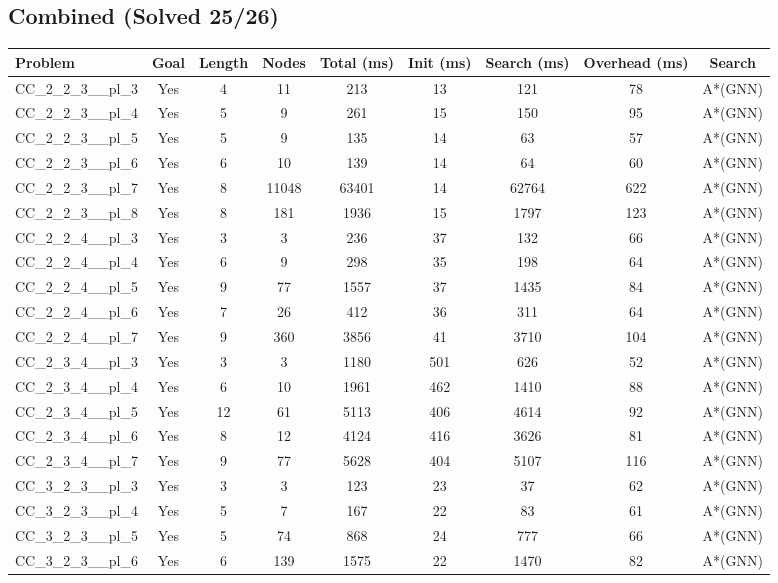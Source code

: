 \documentclass{article}
\begin{document}
\subsection*{Combined (Solved 25/26)}
\begin{tabular}{lcccccccc}
\toprule
Problem & Goal & Length & Nodes & Total (ms) & Init (ms) & Search (ms) & Overhead (ms) & Search \\
\midrule
CC\_2\_2\_3\_\_pl\_3 & Yes & 4 & 11 & 213 & 13 & 121 & 78 & A*(GNN) \\
CC\_2\_2\_3\_\_pl\_4 & Yes & 5 & 9 & 261 & 15 & 150 & 95 & A*(GNN) \\
CC\_2\_2\_3\_\_pl\_5 & Yes & 5 & 9 & 135 & 14 & 63 & 57 & A*(GNN) \\
CC\_2\_2\_3\_\_pl\_6 & Yes & 6 & 10 & 139 & 14 & 64 & 60 & A*(GNN) \\
CC\_2\_2\_3\_\_pl\_7 & Yes & 8 & 11048 & 63401 & 14 & 62764 & 622 & A*(GNN) \\
CC\_2\_2\_3\_\_pl\_8 & Yes & 8 & 181 & 1936 & 15 & 1797 & 123 & A*(GNN) \\
CC\_2\_2\_4\_\_pl\_3 & Yes & 3 & 3 & 236 & 37 & 132 & 66 & A*(GNN) \\
CC\_2\_2\_4\_\_pl\_4 & Yes & 6 & 9 & 298 & 35 & 198 & 64 & A*(GNN) \\
CC\_2\_2\_4\_\_pl\_5 & Yes & 9 & 77 & 1557 & 37 & 1435 & 84 & A*(GNN) \\
CC\_2\_2\_4\_\_pl\_6 & Yes & 7 & 26 & 412 & 36 & 311 & 64 & A*(GNN) \\
CC\_2\_2\_4\_\_pl\_7 & Yes & 9 & 360 & 3856 & 41 & 3710 & 104 & A*(GNN) \\
CC\_2\_3\_4\_\_pl\_3 & Yes & 3 & 3 & 1180 & 501 & 626 & 52 & A*(GNN) \\
CC\_2\_3\_4\_\_pl\_4 & Yes & 6 & 10 & 1961 & 462 & 1410 & 88 & A*(GNN) \\
CC\_2\_3\_4\_\_pl\_5 & Yes & 12 & 61 & 5113 & 406 & 4614 & 92 & A*(GNN) \\
CC\_2\_3\_4\_\_pl\_6 & Yes & 8 & 12 & 4124 & 416 & 3626 & 81 & A*(GNN) \\
CC\_2\_3\_4\_\_pl\_7 & Yes & 9 & 77 & 5628 & 404 & 5107 & 116 & A*(GNN) \\
CC\_3\_2\_3\_\_pl\_3 & Yes & 3 & 3 & 123 & 23 & 37 & 62 & A*(GNN) \\
CC\_3\_2\_3\_\_pl\_4 & Yes & 5 & 7 & 167 & 22 & 83 & 61 & A*(GNN) \\
CC\_3\_2\_3\_\_pl\_5 & Yes & 5 & 74 & 868 & 24 & 777 & 66 & A*(GNN) \\
CC\_3\_2\_3\_\_pl\_6 & Yes & 6 & 139 & 1575 & 22 & 1470 & 82 & A*(GNN) \\

\end{tabular}
\end{document}
